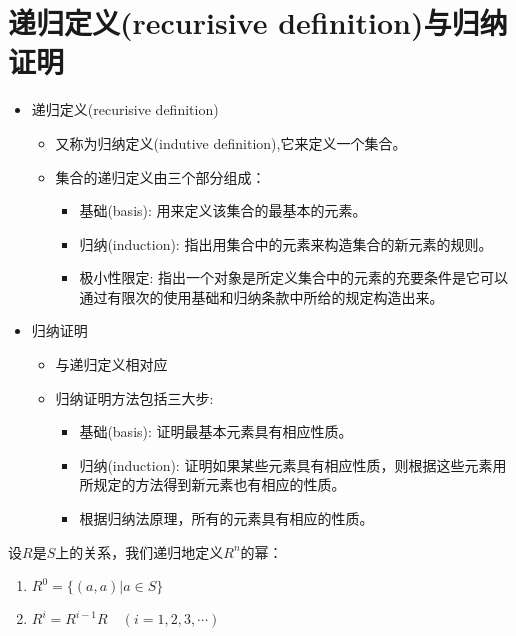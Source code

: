 \section{递归定义(recurisive definition)与归纳证明}
\begin{itemize}
	\item 递归定义(recurisive definition)
	\begin{itemize}
		\item 又称为归纳定义(indutive definition),它来定义一个集合。
		\item 集合的递归定义由三个部分组成：
		\begin{itemize}
			\item 基础(basis): 用来定义该集合的最基本的元素。
			\item 归纳(induction): 指出用集合中的元素来构造集合的新元素的规则。
			\item 极小性限定: 指出一个对象是所定义集合中的元素的充要条件是它可以通过有限次的使用基础和归纳条款中所给的规定构造出来。
		\end{itemize}
	\end{itemize}
    \item 归纳证明
    \begin{itemize}
    	\item 与递归定义相对应
    	\item 归纳证明方法包括三大步:
    	\begin{itemize}
    		\item 基础(basis): 证明最基本元素具有相应性质。
    		\item 归纳(induction): 证明如果某些元素具有相应性质，则根据这些元素用所规定的方法得到新元素也有相应的性质。
    		\item 根据归纳法原理，所有的元素具有相应的性质。
    	\end{itemize}
    \end{itemize}
\end{itemize}

\begin{definition}
	设$R$是$S$上的关系，我们递归地定义$R^n$的幂：
	\begin{enumerate}
		\item $R^0 = \{(a,a)|a\in S\}$
		\item $R^i = R^{i-1}R\quad (i=1,2,3,\cdots)$
	\end{enumerate}
\end{definition}

